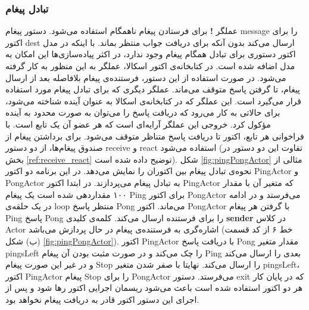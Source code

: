\subsubsection{تبادل پیغام}
عملگر \textbf{!} برای فرستادن پیغام ناهمگام استفاده می‌شود. دستور  پیغام message را برای اکتور dest ارسال می‌کند بدون آنکه برای دریافت جواب منتظر بماند. با اینکه در مدل اکتور دستوری برای تبادل همگام پیغام وجود ندارد، در اکثر پیاده‌سازی‌ها این امکان به مدل اضافه شده است\cite{ActorsJVM2009}. در کتابخانه‌ی اکتور اسکالا، عملگر  به این منظور به کار گرفته می‌شود. در صورت استفاده از این دستور، فرستنده‌ی پیغام بلافاصله بعد از ارسال پیغام، تا گرفتن پاسخ متوقف می‌ماند. عملگر دیگری که برای تبادل پیغام مورد استفاده قرار می‌گیرد \lr{!!} است. این عملگر که در کتابخانه‌ی اسکالا به عنوان \gls{آینده} شناخته می‌شود، برای حالاتی به کار می‌رود که دریافت پاسخ را می‌توان به صورت محدود به آینده مؤکول کرد. خروجی این عملگر آرایه‌ای است که هر عضو آن یک تابع است. با فراخوانی هر تابع، اکتور تا دریافت پاسخ متناظر متوقف می‌شود.
برای برداشتن پیغام از صندوق پیغام‌ها، از دو دستور receive و react استفاده می‌شود (تفاوت این دو دستور در بخش \ref{ref:receive_react} توضیح داده شده است). شکل \ref{fig:pingPongActor} مثالی از نحوه‌ی تبادل پیغام بین اکتوران را نمایش می‌دهد. در این برنامه دو اکتور PingActor و PongActor به تبادل پیغام می‌پردازند. در ابتدا اکتور PingActor که متغیر آن با مقدار ۱۰۰ مقداردهی شده است یک پیغام Ping برای اکتور PongActor می‌فرستد و در ادامه در یک حلقه‌ی loop منتظر پاسخ Pong می‌ماند. اکتور PongActor با گرفتن هر پیغام Ping پاسخ Pong را برای فرستنده ارسال می‌کند. کلمه‌ی کلیدی \textbf{sender} در کلاس Actor اشاره‌گری به فرستنده‌ی پیغام در حال پردازش ‌می‌باشد (خط ۶ از کد قسمت (ب) شکل \ref{fig:pingPongActor}). اکتور PingActor با دریافت پاسخ‌ Pong مقدار متغیر pingsLeft را چک می‌کند و در صورت مثبت بودن آن پیغام Ping بعدی را ارسال می‌کند و در غیر این صورت پیغام Stop را ارسال ‌می‌کند. نهایتا با صفر شدن متغیر pingsLeft، اکتور PingActor پیغام Stop را برای PongActor می‌فرستد. دستور exit که در پایان کار هر دو اکتور استفاده شده است باعث می‌شود ریسمان اجرایی اکتور رها شود و پس از اجرای این دستور اکتور قادر به دریافت پیغام نخواهد بود.

